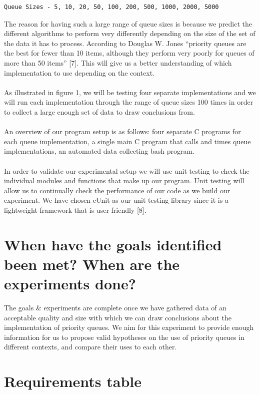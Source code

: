 \documentclass[12pt]{article}
\begin{document}
\begin{verbatim}
Queue Sizes - 5, 10, 20, 50, 100, 200, 500, 1000, 2000, 5000
\end{verbatim}

The reason for having such a large range of queue sizes is because we predict the different algorithms to perform very differently depending on the size of the set of the data it has to process. According to Douglas W. Jones “priority queues are the best for fewer than 10 items, although they perform very poorly for queues of more than 50 items” [7]. This will give us a better understanding of which implementation to use depending on the context.
\\
\\
As illustrated in figure 1, we will be testing four separate implementations and we will run each implementation through the range of queue sizes 100 times in order to collect a large enough set of data to draw conclusions from. 
\\
\\
An overview of our program setup is as follows:  four separate C programs for each queue implementation, a single main C program that calls and times queue implementations, an automated data collecting bash program.
\\
\\
In order to validate our experimental setup we will use unit testing to check the individual modules and functions that make up our program. Unit testing will allow us to continually check the performance of our code as we build our experiment. We have chosen cUnit as our unit testing library since it is a lightweight framework that is user friendly [8].


\section{When have the goals identified been met? When are the experiments done?}

The goals \& experiments are complete once we have gathered data of an acceptable quality and size with which we can draw conclusions about the implementation of priority queues. We aim for this experiment to provide enough information for us to propose valid hypotheses on the use of priority queues in different contexts, and compare their uses to each other.

\section{Requirements table}
\end{document}
